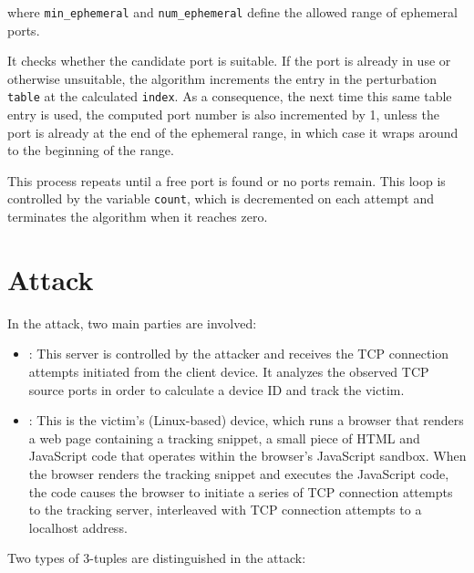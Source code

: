\documentclass[twocolumn]{report}
\begin{document}
where \texttt{min\_ephemeral} and \texttt{num\_ephemeral} define the allowed range of ephemeral ports.

It checks whether the candidate port is suitable. If the port is already in use or otherwise unsuitable, the algorithm increments the entry in the perturbation \texttt{table} at the calculated \texttt{index}. As a consequence, the next time this same table entry is used, the computed port number is also \alert{incremented by 1}, unless the port is already at the end of the ephemeral range, in which case it wraps around to the beginning of the range.

This process \alert{repeats until} a free port is found or no ports remain. This loop is controlled by the variable \texttt{count}, which is decremented on each attempt and terminates the algorithm when it reaches zero.



\section{Attack}
\label{sec:attack}

In the attack, two main parties are involved:

\begin{itemize}
	\item {}: This server is controlled by the \alert{attacker} and receives the TCP connection attempts initiated from the client device. It analyzes the observed TCP source ports in order to calculate a device ID and track the victim.%

	\item {}: This is the \alert{victim’s} (Linux-based) device, which runs a browser that renders a web page containing a \alert{tracking snippet}, a small piece of HTML and JavaScript code that operates within the browser’s JavaScript sandbox. When the browser renders the tracking snippet and executes the JavaScript code, the code causes the browser to initiate a series of TCP connection attempts to the \alert{tracking server}, interleaved with TCP connection attempts to a \alert{localhost address}.
\end{itemize}

Two \alert{types of 3-tuples} are distinguished in the attack:
\end{document}
